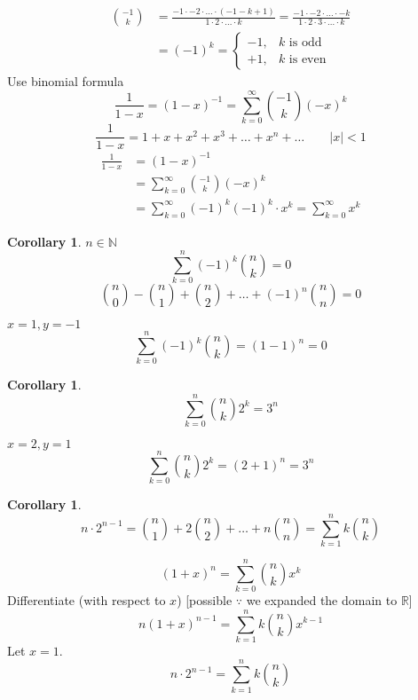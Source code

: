 \documentclass[letterpaper, 12pt]{article}
\newtheorem{corollary}[theorem]{Corollary}
\newenvironment{proof}[1][Proof]{\begin{trivlist}
\item[\hskip \labelsep {\bfseries #1}]}{\end{trivlist}}
\newcommand{\N}{\mathbb{N}}
\newcommand{\R}{\mathbb{R}}
\newcommand{\0}{\emptyset}
\begin{document}
    \begin{align*}
        \binom{-1}{k} &= \frac{-1 \cdot -2 \cdot \dots \cdot (-1 - k + 1)}
        {1 \cdot 2 \cdot \dots \cdot k} = \frac{-1 \cdot -2 \cdot \dots \cdot -k}
        {1 \cdot 2 \cdot 3 \cdot \dots \cdot k} \\
        &= (-1)^k = \begin{cases}
            -1, & k \text{ is odd} \\
            +1, & k \text{ is even}
        \end{cases}
    \end{align*}
    Use binomial formula
    \[\frac{1}{1-x} = (1-x)^{-1} = \sum_{k=0}^{\infty} \binom{-1}{k} (-x)^k\]
    \[\frac{1}{1-x} = 1 + x + x^2 + x^3 + \dots + x^n + \dots \qquad |x| < 1\]
    \begin{align*}
        \frac{1}{1-x} &= (1-x)^{-1} \\
        &= \sum_{k=0}^{\infty} \binom{-1}{k} (-x)^k \\
        &= \sum_{k=0}^{\infty} (-1)^k (-1)^k \cdot x^k = \sum_{k=0}^{\infty} x^k
    \end{align*}
    \begin{corollary}
        $n \in \N$
        \[\sum_{k=0}^{n} (-1)^k \binom{n}{k} = 0\]
        \[\binom{n}{0} - \binom{n}{1} + \binom{n}{2} + \dots + (-1)^n \binom{n}{n} = 0\]
    \end{corollary}
    \begin{proof}
        $x = 1, y = -1$
        \[\sum_{k=0}^{n} (-1)^k \binom{n}{k} = (1-1)^n = 0\]
    \end{proof}
    \begin{corollary}
        \[\sum_{k=0}^{n} \binom{n}{k} 2^k = 3^n\]
    \end{corollary}
    \begin{proof}
        $x = 2, y = 1$
        \[\sum_{k=0}^{n} \binom{n}{k} 2^k = (2+1)^n = 3^n\]
    \end{proof}
    \begin{corollary}
        \[n \cdot 2^{n-1} = \binom{n}{1} + 2\binom{n}{2} + \dots + n\binom{n}{n} 
        = \sum_{k=1}^{n} k \binom{n}{k}\]
    \end{corollary}
    \begin{proof}
        \[(1+x)^n = \sum_{k=0}^{n} \binom{n}{k} x^k\]
        Differentiate (with respect to $x$) [possible $\because$ we expanded the domain to $\R$]
        \[n(1+x)^{n-1} = \sum_{k=1}^{n} k \binom{n}{k} x^{k-1}\]
        Let $x=1$.
        \[n \cdot 2^{n-1} = \sum_{k=1}^{n} k \binom{n}{k}\]
    \end{proof}
\end{document}
